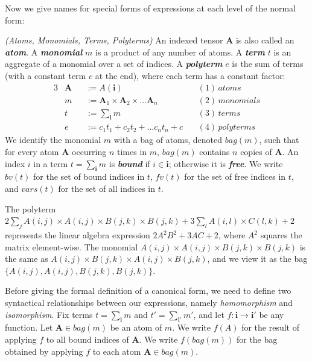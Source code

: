\documentclass{article}
\begin{document}
Now we give names for special forms of expressions at each level of the normal form: 
\begin{definition}{{\em (Atoms, Monomials, Terms, Polyterms)}}\label{forms} 
An indexed tensor $\pmb{A}$ is also called an {\em \textbf{atom}}. 
A {\em \textbf{monomial}} $m$ is a product of any number of atoms. A {\em \textbf{term}} $t$ is an aggregate of a monomial over a set of indices. A {\em \textbf{polyterm}} $e$ is the sum of terms (with a constant term $c$ at the end), where each term has a constant factor: 
\begin{alignat*}{3}
      &\pmb{A} & & := A(\pmb{i}) && (1)\, atoms \\
      &m & & := \pmb{A}_1 \times \pmb{A}_2 \times \dots \pmb{A}_n && (2)\, monomials  \\
      &t & & := \textstyle \sum_{\pmb{i}} m  &&(3)\, terms \\
      &e & & := c_1 t_1 + c_2 t_2 + \dots c_n t_n + c \,&&(4)\, polyterms
\end{alignat*}{}
We identify the monomial $m$ with a bag of atoms, denoted $bag(m)$, such
  that for every atom $\pmb{A}$ occurring $n$ times in $m$, $bag(m)$
  contains $n$ copies of $\pmb{A}$. 
  An index $i$ in a term $t=\sum_{\pmb{i}} m$ is {\em \textbf{bound}} if $i \in \pmb{i}$; otherwise it is {\em \textbf{free}}. We write $bv(t)$ for the set of bound indices in $t$, $fv(t)$ for the set of free indices in $t$, and $vars(t)$ for the set of all indices in $t$. 
\end{definition}{}
\begin{example}{}
The polyterm 
$2 \sum_{j} A(i,j) \times A(i,j) \times B(j,k) \times B(j,k) + 3 \sum_{l} A(i,l) \times C(l,k) + 2$ represents the linear algebra expression $2A^2B^2 + 3AC + 2$, where $A^2$ squares the matrix element-wise. The monomial $A(i,j) \times A(i,j) \times B(j,k) \times B(j,k)$ is the same as $A(i,j)  \times B(j,k) \times A(i,j) \times B(j,k)$, and we view it as the bag $\{A(i,j), A(i,j), B(j,k), B(j,k)\}$. 
\end{example}
Before giving the formal definition of a canonical form, we need to define two syntactical relationships between our expressions, namely {\em homomorphism} and {\em isomorphism}. Fix terms $t = \sum_{\pmb{i}} m$ and $t' = \sum_{\pmb{i'}} m'$, and let $f: \pmb{i} \rightarrow \pmb{i}'$ be any function. Let $\pmb{A} \in bag(m)$ be an atom of $m$. We write $f(A)$ for the result of applying $f$ to all bound indices of $\pmb{A}$. We write $f(bag(m))$ for the bag obtained by applying $f$ to each atom $\pmb{A} \in bag(m)$. 
\end{document}
